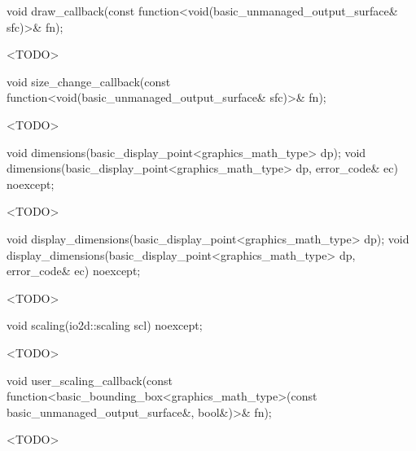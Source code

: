 %
\begin{itemdecl}
void draw_callback(const function<void(basic_unmanaged_output_surface& sfc)>& fn);
\end{itemdecl}
\begin{itemdescr}
\pnum
\effects
<TODO>
\end{itemdescr}

%
\begin{itemdecl}
void size_change_callback(const function<void(basic_unmanaged_output_surface& sfc)>& fn);
\end{itemdecl}
\begin{itemdescr}
\pnum
\effects
<TODO>
\end{itemdescr}

%
\begin{itemdecl}
void dimensions(basic_display_point<graphics_math_type> dp);
void dimensions(basic_display_point<graphics_math_type> dp, error_code& ec) noexcept;
\end{itemdecl}
\begin{itemdescr}
\pnum
\effects
<TODO>
\end{itemdescr}

%
\begin{itemdecl}
void display_dimensions(basic_display_point<graphics_math_type> dp);
void display_dimensions(basic_display_point<graphics_math_type> dp, error_code& ec) noexcept;
\end{itemdecl}
\begin{itemdescr}
\pnum
\effects
<TODO>
\end{itemdescr}

%
\begin{itemdecl}
void scaling(io2d::scaling scl) noexcept;
\end{itemdecl}
\begin{itemdescr}
\pnum
\effects
<TODO>
\end{itemdescr}

%
\begin{itemdecl}
void user_scaling_callback(const
  function<basic_bounding_box<graphics_math_type>(const
  basic_unmanaged_output_surface&, bool&)>& fn);
\end{itemdecl}
\begin{itemdescr}
\pnum
\effects
<TODO>
\end{itemdescr}

